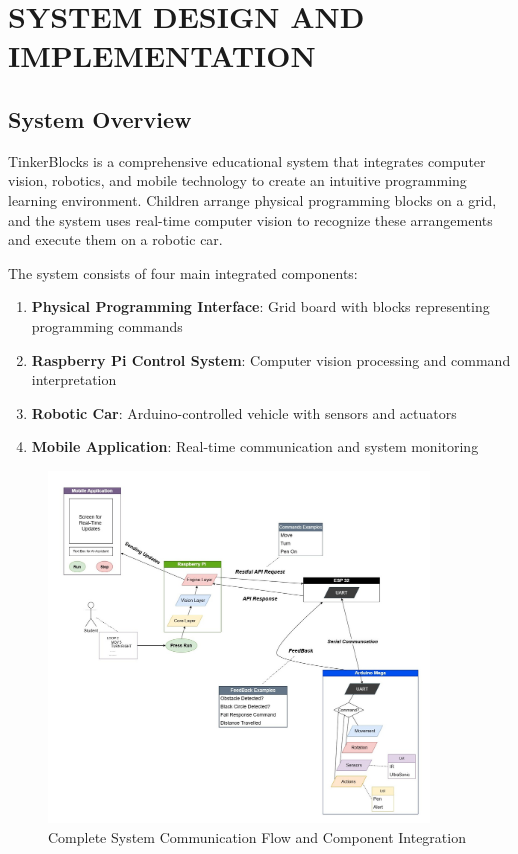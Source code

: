 \chapter{SYSTEM DESIGN AND IMPLEMENTATION}

\section{System Overview}

TinkerBlocks is a comprehensive educational system that integrates computer vision, robotics, and mobile technology to create an intuitive programming learning environment. Children arrange physical programming blocks on a grid, and the system uses real-time computer vision to recognize these arrangements and execute them on a robotic car.

The system consists of four main integrated components:
\begin{enumerate}
    \item \textbf{Physical Programming Interface}: Grid board with blocks representing programming commands
    \item \textbf{Raspberry Pi Control System}: Computer vision processing and command interpretation
    \item \textbf{Robotic Car}: Arduino-controlled vehicle with sensors and actuators
    \item \textbf{Mobile Application}: Real-time communication and system monitoring
\end{enumerate}
\begin{figure}[H]
    \centering
    \includegraphics[width=0.9\textwidth]{assets/system_design.jpg}
    \caption{Complete System Communication Flow and Component Integration}
    \label{fig:system_design}
\end{figure}
